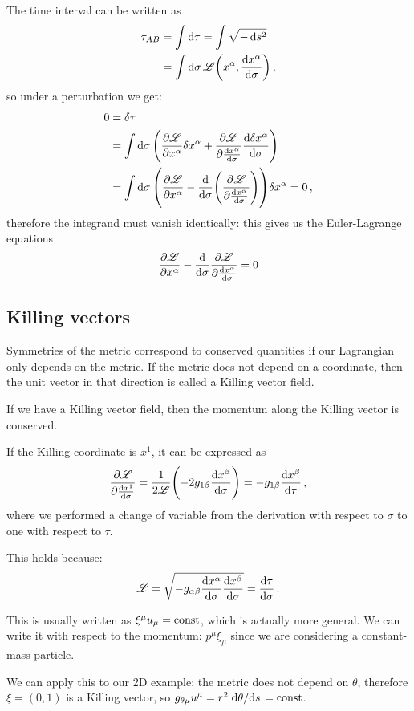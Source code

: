 \documentclass[main.tex]{subfiles}
\begin{document}
The time interval can be written as 
%
\begin{subequations}
\begin{align}
  \tau_{AB} &= \int \dd{\tau } = \int \sqrt{-\dd{s^2}}  \\
  &= \int  \dd{\sigma } \mathscr{L} \qty(x^{\alpha }, \dv{x^{\alpha }}{\sigma }) 
\,,
\end{align}
\end{subequations}
%
so under a perturbation we get: 
%
\begin{subequations}
\begin{align}
  0 &= \delta \tau \\
  &= \int  \dd{\sigma } \qty(
      \pdv{\mathscr{L}}{x^{\alpha }} \delta x^{\alpha } 
      + \pdv{\mathscr{L}}{\dv{x^{\alpha }}{\sigma }} 
      \dv{ \delta x^{\alpha }}{\sigma }
  )  \\
  &= \int  \dd{\sigma } 
  \qty(
      \pdv{\mathscr{L}}{x^{\alpha }} - \dv{}{\sigma } \qty(\pdv[]{\mathscr{L}}{\dv{x^{\alpha }}{\sigma }})
  ) \delta x^{\alpha } =0
\,,
\end{align}
\end{subequations}
%
therefore the integrand must vanish identically: this gives us the Euler-Lagrange equations 
%
\begin{align}
  \pdv{\mathscr{L}}{x^{\alpha }} 
  - \dv{}{\sigma } 
  \pdv{\mathscr{L}}{\dv{x^{\alpha}}{\sigma }}=0
\end{align}

\subsection{Killing vectors}

Symmetries of the metric correspond to conserved quantities if our Lagrangian only depends on the metric.
If the metric does not depend on a coordinate, then the unit vector in that direction is called a Killing vector field. 

If we have a Killing vector field, then the momentum along the Killing vector is conserved.

If the Killing coordinate is \(x^{1}\), it can be expressed as 
%
\begin{align}
  \pdv{\mathscr L}{\dv{x^{1}}{\sigma }} = \frac{1}{2 \mathscr L} \qty(-2 g_{1 \beta } \dv{x^{\beta }}{\sigma }) = - g_{1 \beta } \dv{x^{\beta }}{\tau }
\,,
\end{align}
%
where we performed a change of variable from the derivation with respect to \(\sigma \) to one with respect to \(\tau \).

This holds because:
%
\begin{align}
\mathscr{L} = \sqrt{- g_{\alpha \beta } \dv{x^{\alpha }}{\sigma } \dv{x^{\beta }}{\sigma }} = \dv{\tau }{\sigma }
\,.
\end{align}

This is usually written as \(\xi^{\mu } u_{\mu } = \text{const}\), which is actually more general.
We can write it with respect to the momentum: \(p^{\mu } \xi_{\mu }\) since we are considering a constant-mass particle.

We can apply this to our 2D example: the metric does not depend on \(\theta \), therefore \(\xi = (0,1)\) is a Killing vector, so \(g_{\theta \mu  } u^{\mu } = r^2 \dv*{\theta }{s} = \text{const}\).
\end{document}

